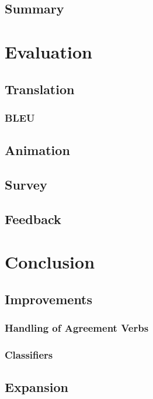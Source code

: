 \documentclass[12pt]{ociamthesis}  %
\begin{document}
\section{Summary}
			

\chapter{Evaluation}

\section{Translation}
	\subsection{BLEU}
\section{Animation}
\section{Survey}
\section{Feedback}


\chapter{Conclusion}

\section{Improvements}
	\subsection{Handling of Agreement Verbs}
	\subsection{Classifiers}
\section{Expansion}

\end{document}

